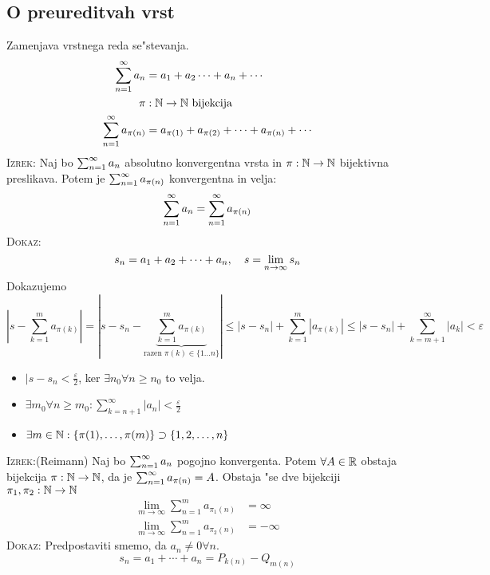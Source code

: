 \subsection{O preureditvah vrst}
Zamenjava vrstnega reda se"stevanja.
\begin{align*}
\sum_{n = 1}^{\infty}a_n &= a_1 + a_2  \cdots + a_n + \cdots \\
\pi&: \mathbb{N}\to \mathbb{N} \text{ bijekcija} \\
\sum_{n = 1}^{\infty}a_{\pi(n)} &= a_{\pi(1)} + a_{\pi(2)} + \cdots + a_{\pi(n)} + \cdots
\end{align*}
\textsc{Izrek:} Naj bo $\sum_{n = 1}^{\infty}a_n$ absolutno konvergentna vrsta in $\pi: \mathbb{N} \to \mathbb{N}$ bijektivna preslikava. Potem je $\sum_{n = 1}^{\infty}a_{\pi(n)}$ konvergentna in velja:
\begin{equation*}
\sum_{n = 1}^{\infty}a_n = \sum_{n = 1}^{\infty}a_{\pi(n)}
\end{equation*}
\textsc{Dokaz:}
\begin{equation*}
s_n = a_1 + a_2 + \cdots + a_n, \quad s = \lim_{n \rightarrow \infty} s_n
\end{equation*}
Dokazujemo 
\begin{equation*}
\left|s-\sum_{k=1}^{m}a_{\pi(k)}\right| = \left|s - s_n - \underbrace{\sum_{k=1}^{m}a_{\pi(k)}}_{\text{razen }\pi(k)\in\{1\ldots n\}}\right| \leq |s - s_n| + \sum_{k=1}^{m}|a_{\pi(k)}| \leq |s-s_n| + \sum_{k = m+1}^{\infty}|a_k| < \varepsilon
\end{equation*}
\begin{itemize}
	\item $|s-s_n < \frac{\varepsilon}{2}$, ker $\exists n_0 \forall n \geq n_0$ to velja.
	\item $\exists m_0 \forall n \geq m_0: \sum_{k=n+1}^{\infty}|a_n| < \frac{\varepsilon}{2}$
	\item $\exists m \in \mathbb{N}: \{\pi(1), \ldots, \pi(m)\} \supset \{1, 2, \ldots, n\}$
\end{itemize}
%
\textsc{Izrek:}(Reimann) Naj bo $\sum_{n = 1}^{\infty}a_n$ pogojno konvergenta. Potem $\forall A \in \mathbb{R}$ obstaja bijekcija $\pi: \mathbb{N} \to \mathbb{N}$, da je $\sum_{n = 1}^{\infty}a_{\pi(n)} = A$. Obstaja "se dve bijekciji $\pi_1, \pi_2: \mathbb{N} \to \mathbb{N}$
\begin{align*}
\lim_{m\to \infty} \sum_{n=1}^{m} a_{\pi_1(n)} &= \infty \\
\lim_{m\to \infty} \sum_{n=1}^{m} a_{\pi_2(n)} &= -\infty
\end{align*}
\textsc{Dokaz:} Predpostaviti smemo, da $a_n \neq 0 \forall n$.
\begin{equation*}
s_n = a_1 + \cdots + a_n = P_{k(n)} - Q_{m(n)}
\end{equation*}
